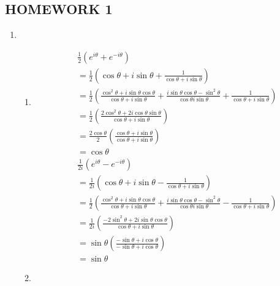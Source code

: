 \documentclass[10pt]{article}
\begin{document}

\begin{centering}
  \section*{HOMEWORK 1}
\end{centering}

\begin{enumerate}
  \item 
    \begin{enumerate}
      \item 
      \begin{align*}
        &\frac{1}{2} \left(  e ^ {i \theta } + e ^ {- i \theta } \right) \\
        &= \frac{1}{2} \left( \cos \theta + i \sin \theta + \frac{1}{\cos \theta + i \sin \theta} \right) \\
        &= \frac{1}{2} \left( \frac{\cos ^2 \theta + i \sin \theta \cos \theta}{\cos \theta + i \sin \theta } + \frac{i \sin \theta \cos \theta - \sin ^2 \theta }{\cos \theta i \sin \theta } + \frac{1}{\cos \theta + i \sin \theta }   \right) \\
        &= \frac{1}{2} \left( \frac{2 \cos ^2 \theta + 2i \cos \theta \sin \theta }{\cos \theta + i \sin \theta } \right) \\
        &= \frac{2 \cos \theta }{2} \left( \frac{\cos \theta +i \sin \theta }{\cos \theta +i \sin \theta } \right) \\
        &= \cos  \theta 
      \end{align*}
      \begin{align*}
        &\frac{1}{2i} \left( e ^ {i \theta } - e ^ {-i \theta } \right) \\
        &= \frac{1}{2i} \left( \cos \theta +i\sin \theta - \frac{1}{\cos \theta +i\sin \theta } \right) \\
        &= \frac{1}{2} \left( \frac{\cos ^2 \theta + i \sin \theta \cos \theta}{\cos \theta + i \sin \theta } + \frac{i \sin \theta \cos \theta - \sin ^2 \theta }{\cos \theta i \sin \theta } - \frac{1}{\cos \theta + i \sin \theta }   \right) \\
        &= \frac{1}{2i} \left( \frac{-2\sin  ^2 \theta +2i\sin \theta \cos \theta }{\cos \theta +i\sin \theta } \right) \\
        &= \sin \theta \left( \frac{-\sin \theta + i\cos \theta }{-\sin \theta + i\cos \theta } \right) \\
        &= \sin \theta 
      \end{align*}
    \item 
    \end{enumerate}
\end{enumerate}
\end{document}
